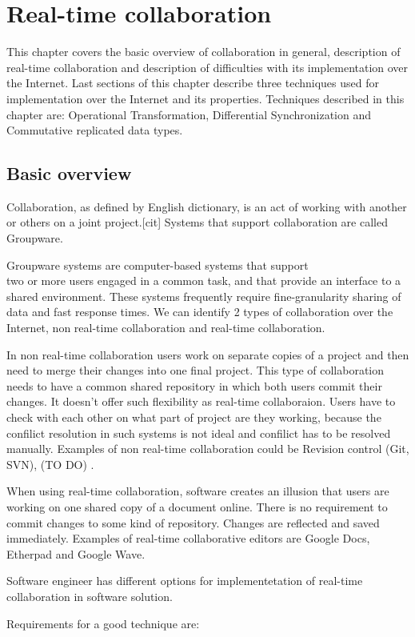 \documentclass[12pt,oneside]{fithesis2}
\begin{document}
\chapter{Real-time collaboration}
This chapter covers the basic overview of collaboration in general, description of real-time collaboration and description of difficulties with its implementation over the Internet. Last sections of this chapter describe three techniques used for implementation over the Internet and its properties. Techniques described in this chapter are: Operational Transformation, Differential Synchronization and Commutative replicated data types.
\section{Basic overview}
Collaboration, as defined by English dictionary, is an act of working with another or others on a joint project.[cit] Systems that support collaboration are called Groupware. \par Groupware systems are computer-based systems that support \\two or more users engaged in a common task, and that provide an interface to a shared environment. These systems frequently require fine-granularity sharing of data and fast response times.\cite{Ellis} We can identify 2 types of collaboration over the Internet, non real-time collaboration and real-time collaboration.\par
In non real-time collaboration users work on separate copies of a project and then need to merge their changes into one final project. This type of collaboration needs to have a common shared repository in which both users commit their changes. It doesn't offer such flexibility as real-time collaboraion. Users have to check with each other on what part of project are they working, because the confilict resolution in such systems is not ideal and confilict has to be resolved manually. Examples of non real-time collaboration could be Revision control (Git, SVN), (TO DO) . \par When using real-time collaboration, software creates an illusion that users are working on one shared copy of a document online. There is no requirement to commit changes to some kind of repository. Changes are reflected and saved immediately. Examples of real-time collaborative editors are Google Docs, Etherpad and Google Wave. \par Software engineer has different options for implementetation of real-time collaboration in software solution. \par Requirements for a good technique are: 
\end{document}
